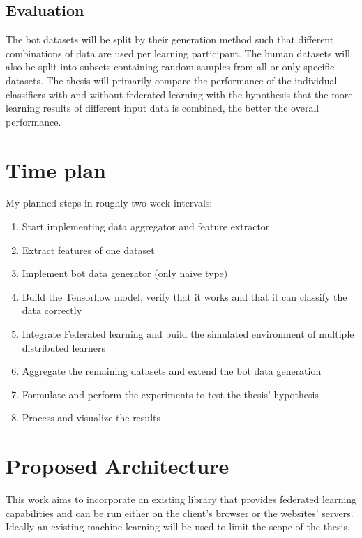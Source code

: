 \documentclass[
    fontsize=12pt,
    headings=small,
    parskip=half,           %
    bibliography=totoc,
    numbers=noenddot,       %
    open=any,               %
    final                   %
    ]{scrreprt}
\begin{document}
\section{Evaluation}

The bot datasets will be split by their generation method such that different combinations of data are used per learning participant. The human datasets will also be split into subsets containing random samples from all or only specific datasets. The thesis will primarily compare the performance of the individual classifiers with and without federated learning with the hypothesis that the more learning results of different input data is combined, the better the overall performance.

\chapter{Time plan}

My planned steps in roughly two week intervals: \\

\begin{enumerate}
	\item Start implementing data aggregator and feature extractor
	\item Extract features of one dataset
	\item Implement bot data generator (only naive type)
	\item Build the Tensorflow model, verify that it works and that it can classify the data correctly
	\item Integrate Federated learning and build the simulated environment of multiple distributed learners
	\item Aggregate the remaining datasets and extend the bot data generation
	\item Formulate and perform the experiments to test the thesis' hypothesis
	\item Process and visualize the results
\end{enumerate}

\iffalse %

\chapter{Proposed Architecture}

This work aims to incorporate an existing library that provides federated learning capabilities and can be run either on the client's browser or the websites' servers. Ideally an existing machine learning will be used to limit the scope of the thesis.
\end{document}
